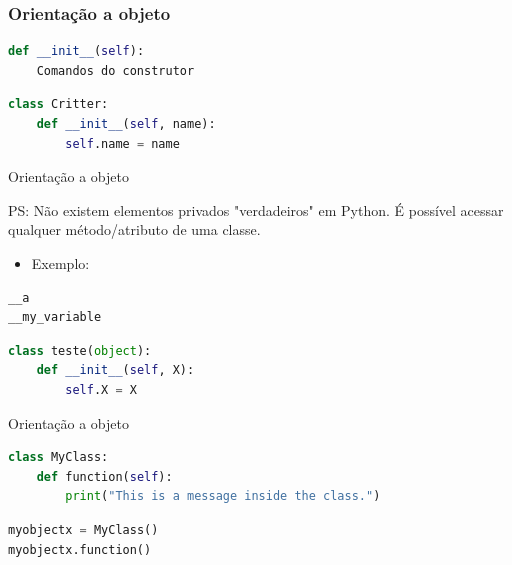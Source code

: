 \documentclass[aspectratio=169]{beamer} %
\begin{document}
\begin{SliTC}

 \frametitle{Orientação a objeto}

\begin{lstlisting}[language=python]
def __init__(self):
    Comandos do construtor
\end{lstlisting}

    


\begin{itemize}
\end{itemize}

\begin{lstlisting}[language=python]
class Critter:
    def __init__(self, name):
        self.name = name
\end{lstlisting}
\end{SliTC}

\begin{SliTC}{Orientação a objeto}


PS: Não existem elementos privados "verdadeiros" em Python. É possível acessar qualquer método/atributo de uma classe.

\begin{itemize}
    \item Exemplo:
\end{itemize}
\begin{lstlisting}[language=python]
__a 
__my_variable
\end{lstlisting}


\begin{lstlisting}[language=python]
class teste(object):
    def __init__(self, X):
        self.X = X
\end{lstlisting}
\end{SliTC}

\begin{SliTC}{Orientação a objeto}

\begin{lstlisting}[language=python]
class MyClass:
    def function(self):
        print("This is a message inside the class.")
\end{lstlisting}
\begin{lstlisting}[language=python]
myobjectx = MyClass()
myobjectx.function()
\end{lstlisting}

\end{SliTC}
\end{document}
